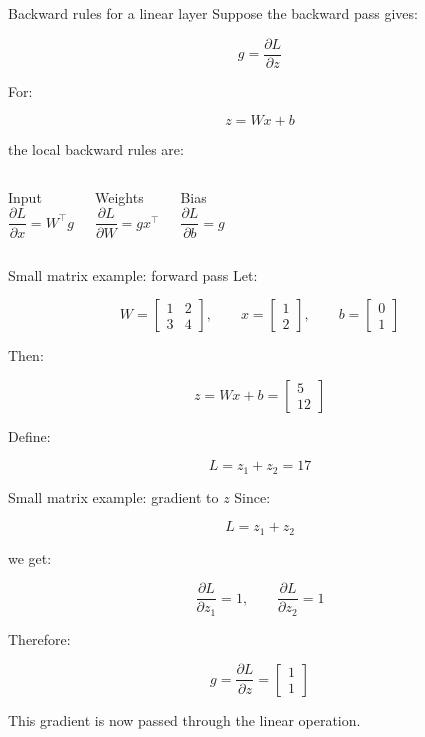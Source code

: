 \documentclass[10pt,aspectratio=169]{beamer}
\newcommand{\grad}[2]{\frac{\partial #1}{\partial #2}}
\begin{document}
\begin{frame}[t]{Backward rules for a linear layer}
Suppose the backward pass gives:

\[
g=\grad{L}{z}
\]

For:

\[
z=Wx+b
\]

the local backward rules are:

\begin{columns}[T]
\begin{block}{Input}
\[
\boxed{
\grad{L}{x}=W^\top g
}
\]
\end{block}

\begin{block}{Weights}
\[
\boxed{
\grad{L}{W}=gx^\top
}
\]
\end{block}

\begin{block}{Bias}
\[
\boxed{
\grad{L}{b}=g
}
\]
\end{block}
\end{columns}
\end{frame}

\begin{frame}[t]{Small matrix example: forward pass}
Let:

\[
W=
\begin{bmatrix}
1&2\\
3&4
\end{bmatrix},
\qquad
x=
\begin{bmatrix}
1\\
2
\end{bmatrix},
\qquad
b=
\begin{bmatrix}
0\\
1
\end{bmatrix}
\]

Then:

\[
z=Wx+b
=
\begin{bmatrix}
5\\
12
\end{bmatrix}
\]

Define:

\[
L=z_1+z_2=17
\]
\end{frame}

\begin{frame}[t]{Small matrix example: gradient to \(z\)}
Since:

\[
L=z_1+z_2
\]

we get:

\[
\grad{L}{z_1}=1,
\qquad
\grad{L}{z_2}=1
\]

Therefore:

\[
\boxed{
g=
\grad{L}{z}
=
\begin{bmatrix}
1\\
1
\end{bmatrix}
}
\]

This gradient is now passed through the linear operation.
\end{frame}
\end{document}
